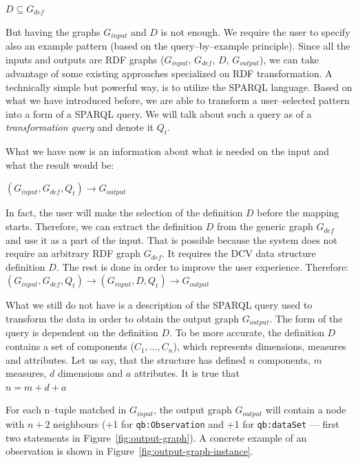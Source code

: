 {\centering $D \subseteq G_{def}$ \\[0.5cm]}

But having the graphs $G_{input}$ and $D$ 
is not enough. We require the user to specify also an example pattern (based on the
query--by--example principle). Since all the inputs and outputs are RDF
graphs ($G_{input}$, $G_{def}$, $D$, $G_{output}$), we can take 
advantage of some existing approaches specialized on RDF transformation. 
A technically simple but powerful way, is to utilize the SPARQL language. Based on what we have introduced before, we are able to transform a user--selected pattern into a form of a SPARQL
query. We will talk about such a query as of a \emph{transformation query} and denote it $Q_t$.

What we have now is an information about what is needed on the input and 
what the result would be:

{\centering $(G_{input}, G_{def}, Q_t) \rightarrow G_{output}$ \\[0.5cm]}

In fact, the user will make the selection of the definition $D$ before the 
mapping starts. Therefore, we can extract the definition $D$ from the 
generic graph $G_{def}$ and use it as a part of the input. That is possible because 
the system does not require an arbitrary RDF graph $G_{def}$. It requires the DCV 
data structure definition $D$. The rest is done in order to improve the user 
experience. Therefore:\\

{\centering $(G_{input}, G_{def}, Q_t) \rightarrow (G_{input}, D, Q_t) \rightarrow G_{output}$  \\[0.5cm]}

What we still do not have is a description of the SPARQL query used to transform the 
data in order to obtain the output graph $G_{output}$. The form of the query is dependent on the 
definition $D$. To be more accurate, the definition $D$ contains
a set of components ($C_1, ... , C_n$), which represents dimensions, measures and attributes. Let us say, that the 
structure has defined $n$ components, $m$ measures, $d$ dimensions and $a$ 
attributes. It is true that\\

{\centering $n = m+d+a$ \\[0.5cm]}

For each n--tuple matched in $G_{input}$, the output graph $G_{output}$ will contain a node with $n+2$ 
neighbours (+1 for \verb|qb:Observation| and +1 for \verb|qb:dataSet| --- first two statements
in Figure~\ref{fig:output-graph}). A concrete example of an observation is shown 
in Figure~\ref{fig:output-graph-instance}.

